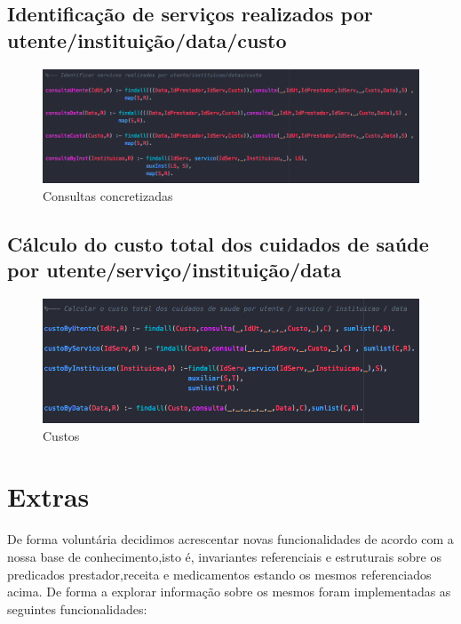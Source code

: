 \documentclass[25pt]{article}
\begin{document}
\subsection{Identificação de serviços realizados por utente/instituição/data/custo}
\begin{figure}[H]
\centering\includegraphics[scale=0.45]{consulta}
\caption{\label{fig:controller}Consultas concretizadas }
\end{figure}

\subsection{Cálculo do custo total dos cuidados de saúde por utente/serviço/instituição/data}


\begin{figure}[H]
\centering\includegraphics[scale=0.5]{custo}
\caption{\label{fig:controller}Custos}
\end{figure}
\newpage

\section{Extras}
De forma voluntária decidimos acrescentar novas funcionalidades de acordo com a nossa base de conhecimento,isto é, invariantes referenciais e estruturais sobre os predicados prestador,receita e medicamentos estando os mesmos referenciados acima.
De forma a explorar informação sobre os mesmos foram implementadas as seguintes funcionalidades:
\end{document}
